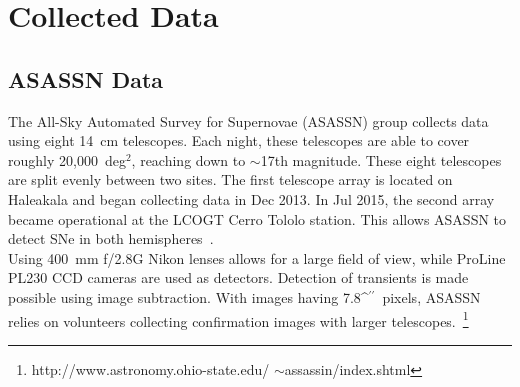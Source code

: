 \documentclass[aps,prb,twocolumn,superscriptaddress]{revtex4-1}
\def\arcsec{\ifmmode^{\prime\prime}\else$^{\prime\prime}$\fi}
\begin{document}
\section{Collected Data}

\subsection{ASASSN Data}

\indent The All-Sky Automated Survey for Supernovae (ASASSN) group 
collects data using eight 14~cm telescopes. Each night, these  
telescopes are able to cover roughly 20,000~deg$^2$, reaching 
down to $\sim$17th magnitude.  
These eight telescopes are split evenly between two sites.  
The first telescope array is located on Haleakala and began 
collecting data in Dec 2013. In Jul 2015, the second %
array became operational at the LCOGT Cerro Tololo station.  
This allows ASASSN to detect SNe in both 
hemispheres~\cite{asn_data}.\\
\indent Using 400~mm f/2.8G Nikon lenses allows for a large field of 
view, while ProLine PL230 CCD cameras are used as detectors. Detection of 
transients is made possible using image subtraction. With images 
having 7.8\arcsec\ pixels, ASASSN relies on volunteers collecting  
confirmation images with larger 
telescopes.~\footnote{\label{foot:asn} http://www.astronomy.ohio-state.edu/ $\sim$assassin/index.shtml}
\end{document}
